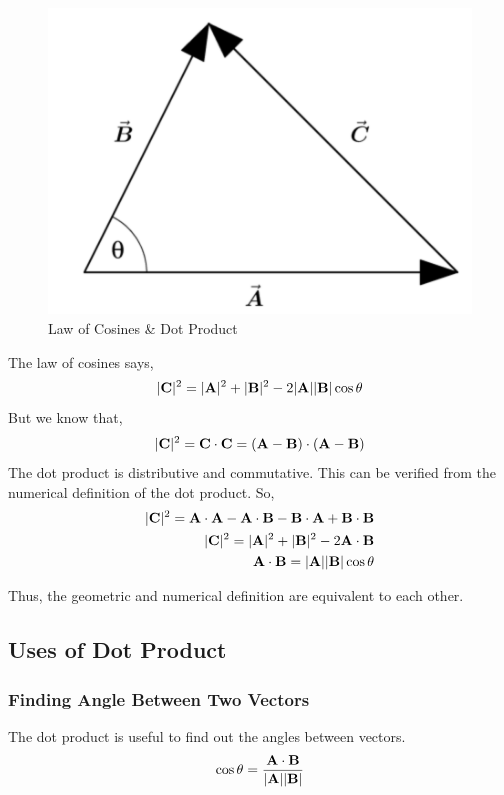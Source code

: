 \begin{figure}[ht!]
	\centering
	\includegraphics[scale=0.5]{./images/lecture_1_figure_2.png}
	\caption{Law of Cosines \& Dot Product}
\end{figure}

The law of cosines says, $$ |{\bf C}|^2 = |{\bf A}|^2 + |{\bf B}|^2 - 2|{\bf A}||{\bf B}|\cos \theta $$
But we know that, $$|{\bf C}|^2 = {\bf C} \cdot {\bf C} = ({\bf A} - {\bf B}) \cdot ({\bf A} - {\bf B}) $$
The dot product is distributive and commutative. This can be verified from the numerical definition of the dot product.
So,
\begin{eqnarray*}
	|{\bf C}|^2 = {\bf A} \cdot {\bf A} - {\bf A} \cdot {\bf B} - {\bf B} \cdot {\bf A} + {\bf B} \cdot {\bf B} \\
	|{\bf C}|^2 = |{\bf A}|^2 + |{\bf B}|^2 - 2 {\bf A} \cdot {\bf B} \\
	{\bf A} \cdot {\bf B} = |{\bf A}||{\bf B}| \cos \theta
\end{eqnarray*}

Thus, the geometric and numerical definition are equivalent to each other.

\subsection{Uses of Dot Product}

\subsubsection{Finding Angle Between Two Vectors}

The dot product is useful to find out the angles between vectors.
$$ \cos \theta = \frac{ {\bf A} \cdot {\bf B} }{ |{\bf A}| |{\bf B}| } $$

